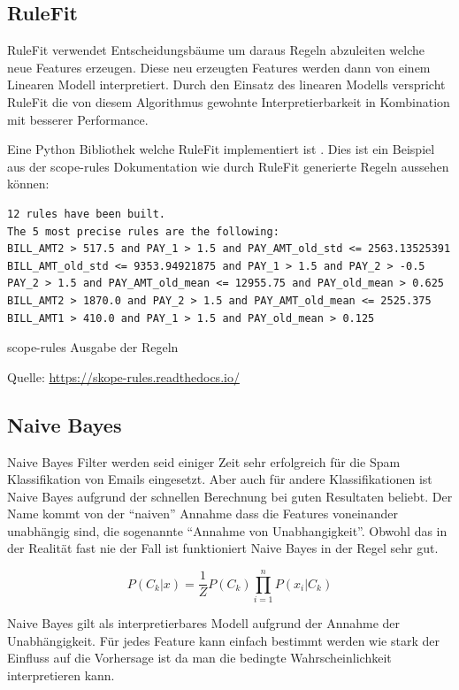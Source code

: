 \documentclass[
  12pt, %
  a4paper, %
  oneside, %
  openany, 
  numbers=noenddot, %
  BCOR=5mm, %
  parskip=half*, %
  thesis, %
]{bfhbook}
\begin{document}
\subsection{RuleFit}
\label{RF}
RuleFit \parencite{Friedman2008} verwendet Entscheidungsbäume um daraus Regeln abzuleiten welche neue Features erzeugen. Diese neu erzeugten Features werden dann von einem Linearen Modell interpretiert. Durch den Einsatz des linearen Modells verspricht RuleFit die von diesem Algorithmus gewohnte Interpretierbarkeit in Kombination mit besserer Performance.

Eine Python Bibliothek welche RuleFit implementiert ist \parencite{scopeRules}. Dies ist ein Beispiel aus der scope-rules Dokumentation wie durch RuleFit generierte Regeln aussehen können:
\begin{minipage}[t]{\linewidth}
\begin{lstlisting}
12 rules have been built.
The 5 most precise rules are the following:
BILL_AMT2 > 517.5 and PAY_1 > 1.5 and PAY_AMT_old_std <= 2563.13525391
BILL_AMT_old_std <= 9353.94921875 and PAY_1 > 1.5 and PAY_2 > -0.5
PAY_2 > 1.5 and PAY_AMT_old_mean <= 12955.75 and PAY_old_mean > 0.625
BILL_AMT2 > 1870.0 and PAY_2 > 1.5 and PAY_AMT_old_mean <= 2525.375
BILL_AMT1 > 410.0 and PAY_1 > 1.5 and PAY_old_mean > 0.125
\end{lstlisting}
\caption {scope-rules Ausgabe der Regeln}
\caption*{Quelle: \url{https://skope-rules.readthedocs.io/}}
\end{minipage}

\subsection{Naive Bayes}
\label{nb}
Naive Bayes Filter werden seid einiger Zeit sehr erfolgreich für die Spam Klassifikation von Emails eingesetzt. Aber auch für andere Klassifikationen ist Naive Bayes aufgrund der schnellen Berechnung bei guten Resultaten beliebt. Der Name kommt von der ``naiven'' Annahme dass die Features voneinander unabhängig sind, die sogenannte  ``Annahme von Unabhangigkeit''. Obwohl das in der Realität fast nie der Fall ist funktioniert Naive Bayes in der Regel sehr gut.

\[ P(C_k|x) = \frac{1}{Z}P(C_k) \prod_{i=1}^{n}  P(x_i|C_k) \]

Naive Bayes gilt als interpretierbares Modell aufgrund der Annahme der Unabhängigkeit. Für jedes Feature kann einfach bestimmt werden wie stark der Einfluss auf die Vorhersage ist da man die bedingte Wahrscheinlichkeit interpretieren kann.
\end{document}
